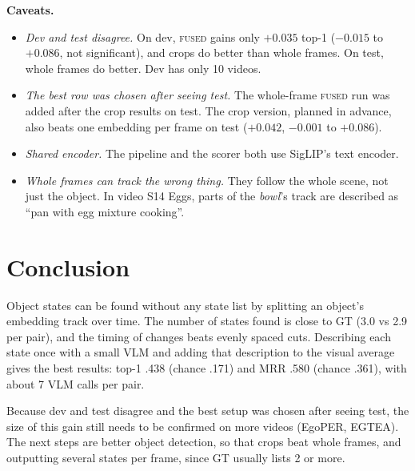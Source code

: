 \documentclass[10pt]{article}
\begin{document}
\textbf{Caveats.}
\begin{itemize}
\item \emph{Dev and test disagree.} On dev, \textsc{fused} gains only $+0.035$ top-1 ($-0.015$ to $+0.086$,
not significant), and crops do better than whole frames. On test, whole frames do better. Dev has only 10
videos.
\item \emph{The best row was chosen after seeing test.} The whole-frame \textsc{fused} run was added after the
crop results on test. The crop version, planned in advance, also beats one embedding per frame on test
($+0.042$, $-0.001$ to $+0.086$).
\item \emph{Shared encoder.} The pipeline and the scorer both use SigLIP's text encoder.
\item \emph{Whole frames can track the wrong thing.} They follow the whole scene, not just the object. In
video S14 Eggs, parts of the \emph{bowl}'s track are described as ``pan with egg mixture cooking''.
\end{itemize}

\section{Conclusion}
Object states can be found without any state list by splitting an object's embedding track over time. The
number of states found is close to GT (3.0 vs 2.9 per pair), and the timing of changes beats evenly spaced
cuts. Describing each state once with a small VLM and adding that description to the visual average gives
the best results: top-1 .438 (chance .171) and MRR .580 (chance .361), with about 7 VLM calls per pair.

Because dev and test disagree and the best setup was chosen after seeing test, the size of this gain still
needs to be confirmed on more videos (EgoPER, EGTEA). The next steps are better object detection, so that
crops beat whole frames, and outputting several states per frame, since GT usually lists 2 or more.
\end{document}
